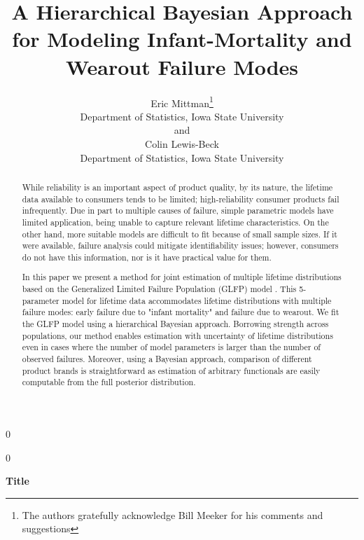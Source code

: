 \documentclass[12pt]{article}
\newcommand{\blind}{0}
\begin{document}
\def\spacingset#1{\renewcommand{\baselinestretch}%
{#1}\small\normalsize} \spacingset{1}



\blind
{
  \title{\bf A Hierarchical Bayesian Approach for Modeling Infant-Mortality and Wearout Failure Modes}
  \author{Eric Mittman\thanks{
    The authors gratefully acknowledge Bill Meeker for his comments and suggestions}\hspace{.2cm}\\
    Department of Statistics, Iowa State University\\
    and \\
    Colin Lewis-Beck \\
    Department of Statistics, Iowa State University}
  \maketitle
} \fi

\blind
{
  \bigskip
  \bigskip
  \bigskip
  \begin{center}
    {\LARGE\bf Title}
\end{center}
  \medskip
} \fi

\bigskip
\begin{abstract}
While reliability is an important aspect of product quality, by its nature, the lifetime data available to consumers tends to be limited; high-reliability consumer products fail infrequently. Due in part to multiple causes of failure, simple parametric models have limited application, being unable to capture relevant lifetime characteristics. On the other hand, more suitable models are difficult to fit because of small sample sizes. If it were available, failure analysis could mitigate identifiability issues; however, consumers do not have this information, nor is it have practical value for them.

In this paper we present a method for joint estimation of multiple lifetime distributions based on the Generalized Limited Failure Population (GLFP) model \citep{chan}. This 5-parameter model for lifetime data accommodates lifetime distributions with multiple failure modes:  early failure due to "infant mortality" and failure due to wearout. We fit the GLFP model using a hierarchical Bayesian approach.  Borrowing strength across populations, our method enables estimation with uncertainty of lifetime distributions even in cases where the number of model parameters is larger than the number of observed failures.  Moreover, using a Bayesian approach, comparison of different product brands is straightforward as estimation of arbitrary functionals are easily computable from the full posterior distribution.
\end{abstract}
\end{document}
